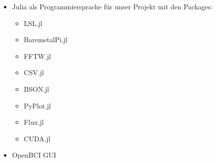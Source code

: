 \documentclass[10pt]{article}
\begin{document}
\begin{itemize}
\begin{multicols}{3}
\begin{itemize}
        \item CPU: i7-11800H
        \item GPU: RTX 3060
        \item RAM: 64\,GB
    \end{itemize}
    \end{multicols}
    \vspace*{-2ex}
    \item Julia als Programmiersprache für unser Projekt mit den Packages:
    \vspace*{-2ex}
    \begin{multicols}{4}
    \begin{itemize}
        \item LSL.jl
        \item BaremetalPi.jl
        \item FFTW.jl
        \item CSV.jl
        \item BSON.jl
        \item PyPlot.jl
        \item Flux.jl
        \item CUDA.jl
    \end{itemize}
    \end{multicols}
    \vspace*{-2ex}
    \item OpenBCI GUI
    

\end{itemize}
\end{document}
